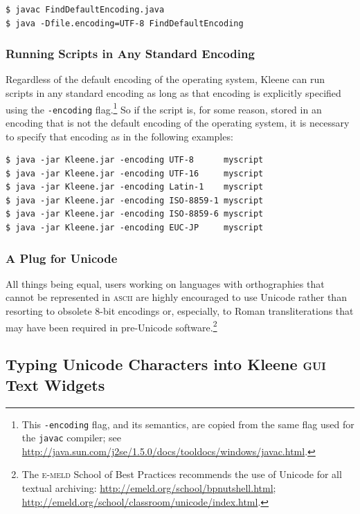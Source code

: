 \documentclass[letterpaper,12pt]{article}
\newcommand{\acro}{\textsc}
\begin{document}
\begin{Verbatim}[fontsize=\small]
$ javac FindDefaultEncoding.java
$ java -Dfile.encoding=UTF-8 FindDefaultEncoding
\end{Verbatim}

\subsubsection{Running Scripts in Any Standard Encoding}

Regardless of the default encoding of the operating system, Kleene can
run scripts in any standard encoding as long as that encoding is
explicitly specified using the \texttt{-encoding} flag.\footnote{This
\texttt{-encoding} flag, and its semantics, are copied from the same flag
used for the \texttt{javac} compiler; see
\url{http://java.sun.com/j2se/1.5.0/docs/tooldocs/windows/javac.html}.}
So if the script is, for some reason, stored in an encoding that is not
the default encoding of the operating system, it is necessary to specify
that encoding as in the following examples: 

\begin{Verbatim}[fontsize=\small]
$ java -jar Kleene.jar -encoding UTF-8      myscript
$ java -jar Kleene.jar -encoding UTF-16     myscript
$ java -jar Kleene.jar -encoding Latin-1    myscript
$ java -jar Kleene.jar -encoding ISO-8859-1 myscript
$ java -jar Kleene.jar -encoding ISO-8859-6 myscript
$ java -jar Kleene.jar -encoding EUC-JP     myscript
\end{Verbatim}

\subsubsection{A Plug for Unicode}

All things being equal, users working on languages with orthographies
that cannot be represented in \acro{ascii} are highly encouraged to use
Unicode rather than resorting to obsolete 8-bit encodings or, especially,
to Roman transliterations that may have been required in pre-Unicode
software.\footnote{The \acro{e-meld} School of Best Practices recommends
the use of Unicode for all textual archiving:
\url{http://emeld.org/school/bpnutshell.html};
\url{http://emeld.org/school/classroom/unicode/index.html}.}

\subsection{Typing Unicode Characters into Kleene \acro{gui} Text Widgets}
\end{document}
